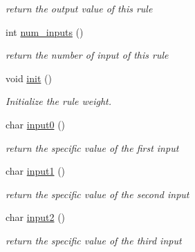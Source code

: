 \begin{DoxyCompactItemize}
\begin{DoxyCompactList}\small\item\em return the output value of this rule \end{DoxyCompactList}\item 
\hypertarget{classMOFSRule_af66e685852c22304b4d35646a99dd6d2}{int \hyperlink{classMOFSRule_af66e685852c22304b4d35646a99dd6d2}{num\-\_\-inputs} ()}\label{classMOFSRule_af66e685852c22304b4d35646a99dd6d2}

\begin{DoxyCompactList}\small\item\em return the number of input of this rule \end{DoxyCompactList}\item 
\hypertarget{classMOFSRule_a9466baffd03ee0ec7015663f538f2b67}{void \hyperlink{classMOFSRule_a9466baffd03ee0ec7015663f538f2b67}{init} ()}\label{classMOFSRule_a9466baffd03ee0ec7015663f538f2b67}

\begin{DoxyCompactList}\small\item\em Initialize the rule weight. \end{DoxyCompactList}\item 
\hypertarget{classMOFSRule_aac720b8f6055c23c45b009eca79aecf0}{char \hyperlink{classMOFSRule_aac720b8f6055c23c45b009eca79aecf0}{input0} ()}\label{classMOFSRule_aac720b8f6055c23c45b009eca79aecf0}

\begin{DoxyCompactList}\small\item\em return the specific value of the first input \end{DoxyCompactList}\item 
\hypertarget{classMOFSRule_a53f778b5ef9362e0e15c26886ef43471}{char \hyperlink{classMOFSRule_a53f778b5ef9362e0e15c26886ef43471}{input1} ()}\label{classMOFSRule_a53f778b5ef9362e0e15c26886ef43471}

\begin{DoxyCompactList}\small\item\em return the specific value of the second input \end{DoxyCompactList}\item 
\hypertarget{classMOFSRule_a77e6c92cd03443458b203ce4bada4d74}{char \hyperlink{classMOFSRule_a77e6c92cd03443458b203ce4bada4d74}{input2} ()}\label{classMOFSRule_a77e6c92cd03443458b203ce4bada4d74}

\begin{DoxyCompactList}\small\item\em return the specific value of the third input \end{DoxyCompactList}\end{DoxyCompactItemize}


